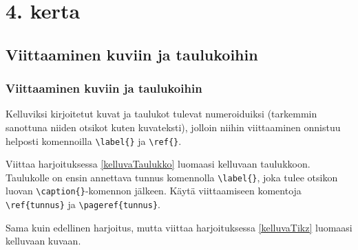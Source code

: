 \section{4. kerta}


\subsection{Viittaaminen kuviin ja taulukoihin}

\begin{fframe}
    \frametitle{Viittaaminen kuviin ja taulukoihin}
    Kelluviksi kirjoitetut kuvat ja taulukot tulevat numeroiduiksi (tarkemmin sanottuna niiden otsikot kuten kuvateksti), jolloin niihin viittaaminen onnistuu helposti komennoilla \lstinline-\label{}- ja \lstinline-\ref{}-. 
    \begin{harj}
        Viittaa harjoituksessa \ref{kelluvaTaulukko} luomaasi kelluvaan taulukkoon. Taulukolle on ensin annettava tunnus komennolla \lstinline-\label{}-, joka tulee otsikon luovan \lstinline-\caption{}--komennon jälkeen. Käytä viittaamiseen komentoja \lstinline-\ref{tunnus}- ja \lstinline-\pageref{tunnus}-.
    \end{harj}
    \begin{harj}
        Sama kuin edellinen harjoitus, mutta viittaa harjoituksessa \ref{kelluvaTikz} luomaasi kelluvaan kuvaan.
    \end{harj}
\end{fframe}


